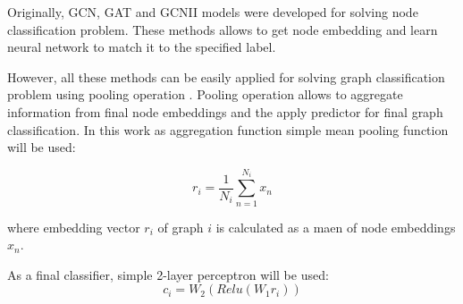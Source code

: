 Originally, GCN, GAT and GCNII models were developed for solving node classification problem.
These methods allows to get node embedding and learn neural network to match it to the specified label.

However, all these methods can be easily applied for solving graph classification problem using pooling operation \cite{distillGCN}.
Pooling operation allows to aggregate information from final node embeddings and the apply predictor for final graph classification.
In this work as aggregation function simple mean pooling function will be used:

\begin{equation}
    r_i = \frac{1}{N_i}\sum_{n=1}^{N_i}x_n
    \label{eq:mean_pool}
\end{equation}

where embedding vector $r_i$ of graph $i$ is calculated as a maen of node embeddings $x_n$.

As a final classifier, simple 2-layer perceptron will be used:
\begin{equation}
    c_i = W_2(Relu(W_1r_i))
    \label{eq:final_classifier}
\end{equation}






